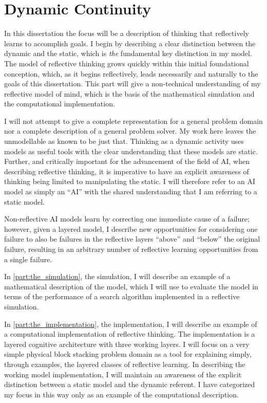 \chapter{Dynamic Continuity}
\label{chapter:dynamic_continuity}

In this dissertation the focus will be a description of thinking that
reflectively learns to accomplish goals.  I begin by describing a
clear distinction between the dynamic and the static, which is
\emph{the} fundamental key distinction in my model.  The model of
reflective thinking grows quickly within this initial foundational
conception, which, as it begins reflectively, leads necessarily and
naturally to the goals of this dissertation.  This part will give a
non-technical understanding of my reflective model of mind, which is
the basis of the mathematical simulation and the computational
implementation.

I will not attempt to give a complete representation for a general
problem domain nor a complete description of a general problem solver.
My work here leaves the unmodellable as known to be just that.
Thinking as a dynamic activity uses models as useful tools with the
clear understanding that these models are static.  Further, and
critically important for the advancement of the field of AI, when
describing reflective thinking, it is imperative to have an explicit
awareness of thinking being limited to manipulating the static.  I
will therefore refer to an AI model as simply an ``AI'' with the
shared understanding that I am referring to a static model.

Non-reflective AI models learn by correcting one immediate cause of a
failure; however, given a layered model, I describe new opportunities
for considering one failure to also be failures in the reflective
layers ``above'' and ``below'' the original failure, resulting in an
arbitrary number of reflective learning opportunities from a single
failure.

In \autoref{part:the_simulation}, the simulation, I will describe an
example of a mathematical description of the model, which I will use
to evaluate the model in terms of the performance of a search
algorithm implemented in a reflective simulation.

In \autoref{part:the_implementation}, the implementation, I will
describe an example of a computational implementation of reflective
thinking.  The implementation is a layered cognitive architecture with
three working layers.  I will focus on a very simple physical block
stacking problem domain as a tool for explaining simply, through
examples, the layered classes of reflective learning.  In describing
the working model implementation, I will maintain an awareness of the
explicit distinction between a static model and the dynamic referent.
I have categorized my focus in this way only as an example of the
computational description.

